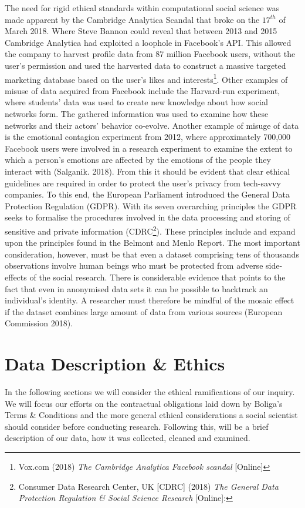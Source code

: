 \documentclass[12pt,a4paper]{article}
\begin{document}
The need for rigid ethical standards within computational social science was made apparent by the Cambridge Analytica Scandal that broke on the $17^{th}$ of March 2018. Where Steve Bannon could reveal that between 2013 and 2015 Cambridge Analytica had exploited a loophole in Facebook’s API. This allowed the company to harvest profile data from 87 million Facebook users, without the user’s permission and used the harvested data to construct a massive targeted marketing database based on the user’s likes and interests\footnote{Vox.com (2018) \textit{The Cambridge Analytica Facebook scandal} [Online]}. Other examples of misuse of data acquired from Facebook include the Harvard-run experiment, where students' data was used to create new knowledge about how social networks form. The gathered information was used to examine how these networks and their actors' behavior co-evolve. Another example of misuge of data is the emotional contagion experiment from 2012, where approximately 700,000 Facebook users were involved in a research experiment to examine the extent to which a person's emotions are affected by the emotions of the people they interact with (Salganik. 2018).\newline
From this it should be evident that clear ethical guidelines are required in order to protect the user's privacy from tech-savvy companies. To this end, the European Parliament introduced the General Data Protection Regulation (GDPR). With its seven overarching principles the GDPR seeks to formalise the procedures involved in the data processing and storing of sensitive and private information (CDRC\footnote{Consumer Data Research Center, UK  [CDRC] (2018) \textit{The General Data Protection Regulation \& Social Science Research} [Online]:}). These principles include and expand upon the principles found in the Belmont and Menlo Report. The most important consideration, however, must be that even a dataset comprising tens of thousands observations involve human beings who must be protected from adverse side-effects of the social research. There is considerable evidence that points to the fact that even in anonymised data sets it can be possible to backtrack an individual's identity. A researcher must therefore be mindful of the mosaic effect if the dataset combines large amount of data from various sources (European Commission 2018).

\section{Data Description \& Ethics}
In the following sections we will consider the ethical ramifications of our inquiry. We will focus our efforts on the contractual obligations laid down by Boliga's Terms \& Conditions and the more general ethical considerations a social scientist should consider before conducting research. Following this, will be a brief description of our data, how it was collected, cleaned and examined.
\end{document}
